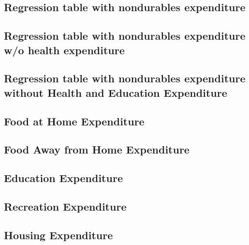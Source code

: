 \documentclass[a4paper,landscape]{article}
\begin{document}
\subsection{Regression table with nondurables expenditure}

\clearpage

\subsection{Regression table with nondurables expenditure w/o health expenditure} 

\clearpage

\subsection{Regression table with nondurables expenditure without Health and Education Expenditure}

\clearpage


\subsection{Food at Home Expenditure}

\clearpage

\subsection{Food Away from Home Expenditure}

\clearpage

\subsection{Education Expenditure}

\clearpage

\subsection{Recreation Expenditure}

\clearpage

\subsection{Housing Expenditure}

\clearpage
\end{document}
